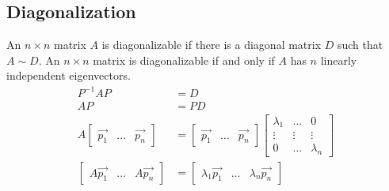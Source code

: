 \documentclass{math}
\begin{document}
\subsection*{Diagonalization}
An \( n\times n \) matrix \( A \) is diagonalizable if there is a diagonal
matrix \( D \) such that \( A\sim D \). An \( n\times n \) matrix is
diagonalizable if and only if \( A \) has \( n \) linearly independent
eigenvectors.
\begin{align*}
  P^{-1}AP &= D \\
  AP &= PD \\
  A\begin{bmatrix}\vec{p_1} & \dots & \vec{p_n}\end{bmatrix} &=
    \begin{bmatrix}\vec{p_1} & \dots & \vec{p_n}\end{bmatrix}
    \begin{bmatrix}
      \lambda_1 & \dots & 0 \\
      \vdots & \vdots & \vdots \\
      0 & \dots & \lambda_n
    \end{bmatrix} \\
  \begin{bmatrix}
    A\vec{p_1} & \dots & A\vec{p_n}
  \end{bmatrix} &= \begin{bmatrix}
    \lambda_1\vec{p_1} & \dots & \lambda_n\vec{p_n}
  \end{bmatrix}
\end{align*}
\end{document}
